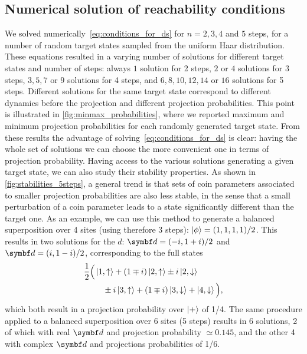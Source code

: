 \subsection{Numerical solution of reachability conditions}
\label{sec:numerical_solution_reachability_conditions}
We solved numerically~\cref{eq:conditions_for_ds} for $n=2,3,4$ and $5$ steps, for a number of random target states sampled from the uniform Haar distribution.
These equations resulted in a varying number of solutions for different target states and number of steps:
always $1$ solution for 2 steps, $2$ or $4$ solutions for 3 steps, $3, 5, 7$ or $9$ solutions for 4 steps,
and $6, 8, 10, 12, 14$ or $16$ solutions for 5 steps.
Different solutions for the same target state correspond to different dynamics before the projection and different projection probabilities.
This point is illustrated in \cref{fig:minmax_probabilities}, where we reported maximum and minimum projection probabilities for each randomly generated target state.
From these results the advantage of solving~\cref{eq:conditions_for_ds} is clear: having the whole set of solutions we can choose the more convenient one in terms of projection probability.
Having access to the various solutions generating a given target state, we can also study their stability properties.
As shown in \cref{fig:stabilities_5steps}, a general trend is that sets of coin parameters associated to smaller projection probabilities are also less stable, in the sense that a small perturbation of a coin parameter leads to a state significantly different than the target one.
As an example, we can use this method to generate a balanced superposition over 4 sites (using therefore 3 steps): $\ket\phi = (1, 1, 1, 1) / 2$.
This results in two solutions for the $d$: $\bs d = (-i, 1+i)/2$ and $\bs d = (i, 1 - i)/2$,
corresponding to the full states
\begin{equation*}
\begin{split}
	\frac{1}{2}\Big(
		&\ket{1,\uparrow} + 
		(1 \mp i) \ket{2,\uparrow} \pm i \ket{2, \downarrow} \\
		&\quad \pm i \ket{3, \uparrow} + (1 \mp i) \ket{3, \downarrow} +
		\ket{4, \downarrow}
	\Big),
\end{split}
\end{equation*}
which both result in a projection probability over $\ket+$ of 1/4.
The same procedure applied to a balanced superposition over 6 sites (5 steps) results in 6 solutions, 2 of which with real $\bs d$ and projection probability $\simeq 0.145$, and the other 4 with complex $\bs d$ and projections probabilities of 1/6.
